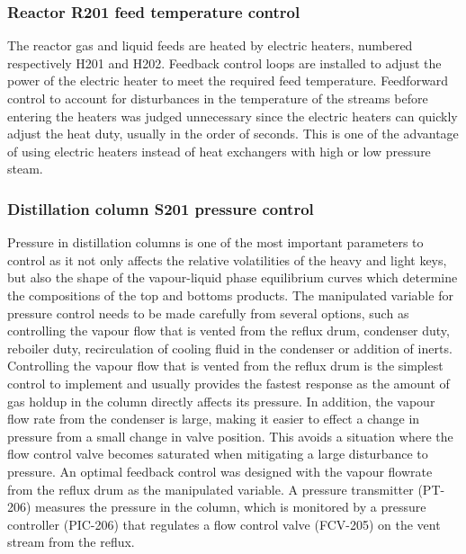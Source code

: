\subsubsection{Reactor R201 feed temperature control}%
The reactor gas and liquid feeds are heated by electric heaters, numbered respectively H201 and H202. Feedback control loops are installed to adjust the power of the electric heater to meet the required feed temperature. Feedforward control to account for disturbances in the temperature of the streams before entering the heaters was judged unnecessary since the electric heaters can quickly adjust the heat duty, usually in the order of seconds. This is one of the advantage of using electric heaters instead of heat exchangers with high or low  pressure steam.


\subsubsection{Distillation column S201 pressure control} %
Pressure in distillation columns is one of the most important parameters to control as it not only affects the relative volatilities of the heavy and light keys, but also the shape of the vapour-liquid phase equilibrium curves which determine the compositions of the top and bottoms products. The manipulated variable for pressure control needs to be made carefully from several options, such as controlling the vapour flow that is vented from the reflux drum, condenser duty, reboiler duty, recirculation of cooling fluid in the condenser or addition of inerts. Controlling the vapour flow that is vented from the reflux drum is the simplest control to implement and usually provides the fastest response as the amount of gas holdup in the column directly affects its pressure. In addition, the vapour flow rate from the condenser is large, making it easier to effect a change in pressure from a small change in valve position. This avoids a situation where the flow control valve becomes saturated when mitigating a large disturbance to pressure. 
An optimal feedback control was designed with the vapour flowrate from the reflux drum as the manipulated variable. A pressure transmitter (PT-206) measures the pressure in the column, which is monitored by a pressure controller (PIC-206) that regulates a flow control valve (FCV-205) on the vent stream from the reflux.




